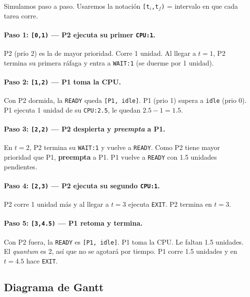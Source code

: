 \documentclass[11pt,a4paper]{article}
\begin{document}
Simulamos paso a paso. Usaremos la notación \texttt{[t$_i$,t$_f$)} =
intervalo en que cada tarea corre.

\paragraph{Paso 1: \texttt{[0,1)} --- P2 ejecuta su primer
\texttt{CPU:1}.}
P2 (prio 2) es la de mayor prioridad. Corre 1 unidad. Al llegar a
$t=1$, P2 termina su primera ráfaga y entra a \texttt{WAIT:1} (se
duerme por 1 unidad).

\paragraph{Paso 2: \texttt{[1,2)} --- P1 toma la CPU.}
Con P2 dormida, la \texttt{READY} queda \texttt{[P1, idle]}. P1 (prio
1) supera a \texttt{idle} (prio 0). P1 ejecuta 1 unidad de su
\texttt{CPU:2.5}, le quedan $2.5 - 1 = 1.5$.

\paragraph{Paso 3: \texttt{[2,2)} --- P2 despierta y \emph{preempta} a
P1.}
En $t=2$, P2 termina su \texttt{WAIT:1} y vuelve a \texttt{READY}. Como
P2 tiene mayor prioridad que P1, \textbf{preempta} a P1. P1 vuelve a
\texttt{READY} con 1.5 unidades pendientes.

\paragraph{Paso 4: \texttt{[2,3)} --- P2 ejecuta su segundo
\texttt{CPU:1}.}
P2 corre 1 unidad más y al llegar a $t=3$ ejecuta \texttt{EXIT}. P2
termina en $t=3$.

\paragraph{Paso 5: \texttt{[3,4.5)} --- P1 retoma y termina.}
Con P2 fuera, la \texttt{READY} es \texttt{[P1, idle]}. P1 toma la
CPU. Le faltan 1.5 unidades. El \emph{quantum} es 2, así que no se
agotará por tiempo. P1 corre 1.5 unidades y en $t=4.5$ hace
\texttt{EXIT}.

\subsection*{Diagrama de Gantt}
\end{document}
